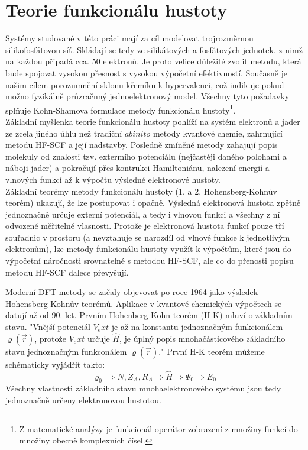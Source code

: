 \documentclass[
  digital, %
  table,   %
  lof,     %
  lot,     %
  oneside,
]{fithesis3}
\begin{document}
\section{Teorie funkcionálu hustoty}
Systémy studované v této práci mají za cíl modelovat trojrozměrnou silikofosfátovou síť. Skládají se tedy ze silikátových a fosfátových jednotek. z nimž na každou připadá cca. 50 elektronů. Je proto velice důležité zvolit metodu, která bude spojovat vysokou přesnost s vysokou výpočetní efektivností. Současně je našim cílem porozumnění sklonu křemíku k hypervalenci, což indikuje pokud možno fyzikálně průzračnný jednoelektronový model. Všechny tyto požadavky splňuje Kohn-Shamova formulace metody funkcionálu hustoty\footnote{Z matematické analýzy je funkcionál operátor zobrazení z množiny funkcí do množiny obecně komplexních čísel.}\cite{bickelhaupt2007kohn}.\\
Základní myšlenka teorie funkcionálu hustoty pohlíží na systém elektronů a jader ze zcela jiného úhlu než tradiční $ab inito$ metody kvantové chemie, zahrnující metodu HF-SCF a její nadstavby. Posledně zmíněné metody zahajují popis molekuly od znalosti tzv. extermího potenciálu (nejčastěji daného polohami  a náboji jader) a pokračují přes kontrukci Hamiltoniánu, nalezení energií a vlnových funkcí až k výpočtu výsledné elektronové hustoty.\\
Základní teorémy metody funkcionálu hustoty (1. a 2. Hohensberg-Kohnův teorém) ukazují, že lze postupovat i opačně. Výsledná elektronová hustota zpětně jednoznačně určuje externí potenciál, a tedy i vlnovou funkci a všechny z ní odvozené měřitelné vlasnosti. Protože je elektronová hustota funkcí pouze tří souřadnic v prostoru (a nevztahuje se narozdíl od vlnové funkce k jednotlivým elektronům), lze metody funkcionálu hustoty využít k výpočtům, které jsou do výpočetní náročnosti srovnatelné s metodou HF-SCF, ale co do přenosti popisu metodu HF-SCF dalece převyšují.
\cite{jensen2007introduction}

Moderní DFT metody se začaly objevovat po roce 1964 jako výsledek Hohensberg-Kohnův teorémů. Aplikace v kvantově-chemických výpočtech se datují až od 90. let. Prvním Hohenberg-Kohn teorém (H-K) mluví o základním stavu. "Vnější potenciál  $V_ext$ je až na konstantu jednoznačným funkcionálem $\varrho(\vec{r})$, protože $V_ext$ určuje $\widehat{H}$, je úplný popis mnohačásticového základního stavu jednoznačným funkconálem $\varrho(\vec{r})$."\cite{PhysRev.136.B864} První H-K teorém můžeme schématicky vyjádřit takto:
\begin{equation}
\varrho_0 \Rightarrow {N, Z_A, R_A} \Rightarrow \widehat{H} \Rightarrow \Psi_0 \Rightarrow E_0
 \end{equation}
 Všechny vlastnosti základního stavu mnohaelektronového systému jsou tedy jednoznačně určeny elektronovou hustotou.
\end{document}
